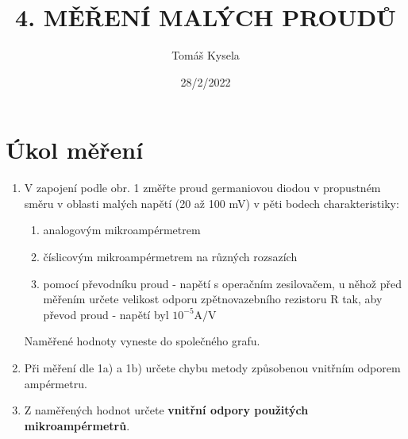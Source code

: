 \documentclass{article}
\title{\textbf{4. MĚŘENÍ MALÝCH PROUDŮ}}
\author{Tomáš Kysela}
\date{28/2/2022}
\begin{document}
	
	\maketitle
	
	\section{Úkol měření}
	\begin{enumerate}
		\item V zapojení podle obr. 1 změřte proud germaniovou diodou v propustném  směru v oblasti malých napětí (20 až 100 mV) v pěti bodech charakteristiky:
		\begin{enumerate}
			\item analogovým mikroampérmetrem
			\item číslicovým mikroampérmetrem na různých rozsazích
			\item pomocí převodníku proud - napětí s operačním zesilovačem, u něhož před měřením určete velikost odporu zpětnovazebního rezistoru R tak, aby převod proud - napětí byl $10^{-5} \si{\ampere\per\volt}$
		\end{enumerate}
		Naměřené hodnoty vyneste do společného grafu.
		\item Při měření dle 1a) a 1b) určete chybu metody způsobenou vnitřním odporem ampérmetru.
		\item Z naměřených hodnot určete \textbf{vnitřní odpory použitých mikroampérmetrů}.
	\end{enumerate}
	
\end{document}
